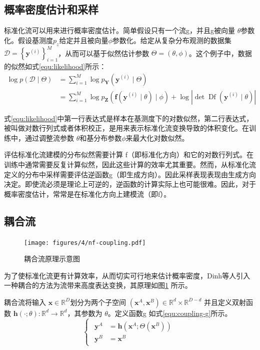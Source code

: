 \subsection{概率密度估计和采样} 

标准化流可以用来进行概率密度估计。简单假设只有一个流g，并且g被向量 $\theta$参数化。假设基测度$p_{z}$给定并且被向量$\phi$参数化。给定从复杂分布观测的数据集 $\mathcal{D}=\left\{\mathbf{y}^{(i)}\right\}_{i=1}^{M}$，从而可以基于似然估计参数 $\Theta=(\theta, \phi)$。这个例子中，数据的似然如式\ref{equ:likelihood}所示：
\begin{equation}\label{equ:likelihood}
	\begin{aligned}\log p(\mathcal{D} \mid \Theta) & =\sum_{i=1}^{M} \log p_{\mathbf{Y}}\left(\mathbf{y}^{(i)} \mid \Theta\right) \\& =\sum_{i=1}^{M} \log p_{\mathbf{Z}}\left(\mathbf{f}\left(\mathbf{y}^{(i)} \mid \theta\right) \mid \phi\right)+\log \left|\operatorname{det} \operatorname{Df}\left(\mathbf{y}^{(i)} \mid \theta\right)\right|\end{aligned}
\end{equation}


式\ref{equ:likelihood}中第一行表达式是样本在基测度下的对数似然，第二行表达式，被叫做对数行列式或者体积校正，是用来表示标准化流变换导致的体积变化。在训练中，通过调整流参数 $\theta$和基分布参数$\phi$来最大化对数似然。

评估标准化流建模的分布似然需要计算 f（即标准化方向）和它的对数行列式。在训练中通常需要反复计算似然，因此这些计算的效率尤其重要。然而，从标准化流定义的分布中采样需要评估逆函数g（即生成方向）。因此采样表现表现由生成方向决定。即使流必须是理论上可逆的，逆函数的计算实际上也可能很难。因此，对于概率密度估计，常常是在标准化方向上建模流（即f）。 

\subsection{耦合流}
\begin{figure}[htbp]
    \centering
    \texttt{[image: figures/4/nf-coupling.pdf]}
    \caption{耦合流原理示意图}
    \label{fig:nf-coupling}
\end{figure}
为了使标准化流更有计算效率，从而切实可行地来估计概率密度，Dinh等人\cite{dinhNICENonlinearIndependent2015}引入一种耦合的方法为流带来高度表达变换，其原理如图\ref{fig:nf-coupling} 所示。


耦合流将输入 $\mathbf{x} \in \mathbb{R}^{D}$划分为两个子空间 $\left(\mathbf{x}^{A}, \mathbf{x}^{B}\right) \in \mathbb{R}^{d} \times \mathbb{R}^{D-d}$ 并且定义双射函数 $\mathbf{h}(\cdot ; \theta): \mathbb{R}^{d} \rightarrow \mathbb{R}^{d}$，其参数为 $\theta$。定义函数g 如式\ref{equ:coupling-g}所示。
\begin{equation}\label{equ:coupling-g}
    \left\{\begin{matrix}
        \begin{aligned}
        \mathbf{y}^{A} & =\mathbf{h}\left(\mathbf{x}^{A} ; \Theta\left(\mathbf{x}^{B}\right)\right) \\
        \mathbf{y}^{B} & =\mathbf{x}^{B}
        \end{aligned} 
        \end{matrix}\right.
\end{equation}


